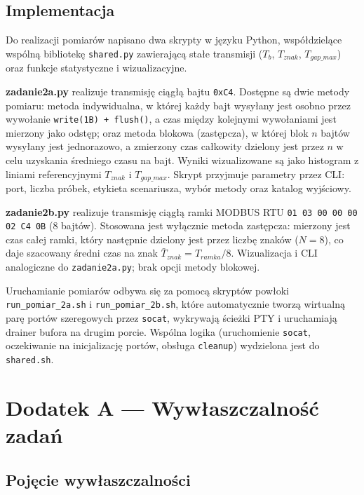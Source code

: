 \documentclass[12pt,a4paper]{article}
\begin{document}
\subsection*{Implementacja}

Do realizacji pomiarów napisano dwa skrypty w języku Python, współdzielące
wspólną bibliotekę \texttt{shared.py} zawierającą stałe transmisji
($T_b$, $T_{znak}$, $T_{gap\_max}$) oraz funkcje statystyczne i wizualizacyjne.

\textbf{zadanie2a.py} realizuje transmisję ciągłą bajtu \texttt{0xC4}.
Dostępne są dwie metody pomiaru: metoda indywidualna, w której każdy bajt
wysyłany jest osobno przez wywołanie \texttt{write(1B) + flush()}, a czas
między kolejnymi wywołaniami jest mierzony jako odstęp; oraz metoda blokowa
(zastępcza), w której blok $n$ bajtów wysyłany jest jednorazowo, a zmierzony
czas całkowity dzielony jest przez $n$ w celu uzyskania średniego czasu na bajt.
Wyniki wizualizowane są jako histogram z liniami referencyjnymi $T_{znak}$
i $T_{gap\_max}$. Skrypt przyjmuje parametry przez CLI: port, liczba próbek,
etykieta scenariusza, wybór metody oraz katalog wyjściowy.

\textbf{zadanie2b.py} realizuje transmisję ciągłą ramki MODBUS RTU
\texttt{01 03 00 00 00 02 C4 0B} (8 bajtów). Stosowana jest wyłącznie metoda
zastępcza: mierzony jest czas całej ramki, który następnie dzielony jest przez
liczbę znaków ($N = 8$), co daje szacowany średni czas na znak
$\bar{T}_{znak} = T_{ramka} / 8$. Wizualizacja i CLI analogiczne do
\texttt{zadanie2a.py}; brak opcji metody blokowej.

Uruchamianie pomiarów odbywa się za pomocą skryptów powłoki
\texttt{run\_pomiar\_2a.sh} i \texttt{run\_pomiar\_2b.sh}, które automatycznie
tworzą wirtualną parę portów szeregowych przez \texttt{socat}, wykrywają
ścieżki PTY i uruchamiają drainer bufora na drugim porcie. Wspólna logika
(uruchomienie \texttt{socat}, oczekiwanie na inicjalizację portów, obsługa
\texttt{cleanup}) wydzielona jest do \texttt{shared.sh}.


\appendix
\section*{Dodatek A — Wywłaszczalność zadań}

\subsection*{Pojęcie wywłaszczalności}
\end{document}
